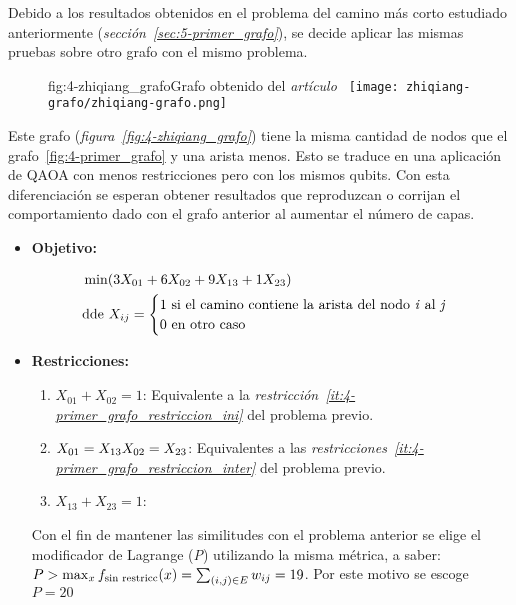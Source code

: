 Debido a los resultados obtenidos en el problema del camino más corto estudiado anteriormente (\textit{sección~\ref{sec:5-primer_grafo}}), se decide aplicar las mismas pruebas sobre otro grafo con el mismo problema.

\begin{figure}[htbp]{fig:4-zhiqiang_grafo}{Grafo obtenido del \textit{artículo~\cite{solving_shortest_path_with_qaoa}}}
  \centering
  \texttt{[image: zhiqiang-grafo/zhiqiang-grafo.png]}
\end{figure}

Este grafo (\textit{figura~\ref{fig:4-zhiqiang_grafo}}) tiene la misma cantidad de nodos que el grafo~\ref{fig:4-primer_grafo} y una arista menos.
Esto se traduce en una aplicación de QAOA con menos restricciones pero con los mismos qubits. Con esta diferenciación se esperan obtener resultados que reproduzcan o corrijan el comportamiento dado con el grafo anterior al aumentar el número de capas.

\begin{itemize}
\item \textbf{Objetivo:}

  \begin{align*}
    &\min(3X_{01} + 6X_{02} + 9X_{13} + 1X_{23}) \\
    &\textnormal{dde } X_{ij} = \begin{cases}
      1 \textnormal{ si el camino contiene la arista del nodo \textit{i} al \textit{j}} \\
      0 \textnormal{ en otro caso}
    \end{cases}
  \end{align*}

\item \textbf{Restricciones:}

  \begin{enumerate}
  \item $X_{01} + X_{02} = 1$: Equivalente a la \textit{restricción~\ref{it:4-primer_grafo_restriccion_ini}} del problema previo.
  \item $X_{01} = X_{13} \\
    X_{02} = X_{23}$: Equivalentes a las \textit{restricciones~\ref{it:4-primer_grafo_restriccion_inter}} del problema previo.

  \item $X_{13} + X_{23} = 1$:  %

  \end{enumerate}

  Con el fin de mantener las similitudes con el problema anterior se elige el modificador de Lagrange (\textit{P}) utilizando la misma métrica, a saber:
  $P > \max_{x}{f_{\textnormal{sin restricc}}(x)} = \sum_{(i, j)\in{E}}{w_{ij}} = 19$. Por este motivo se escoge $P = 20$
\end{itemize}

